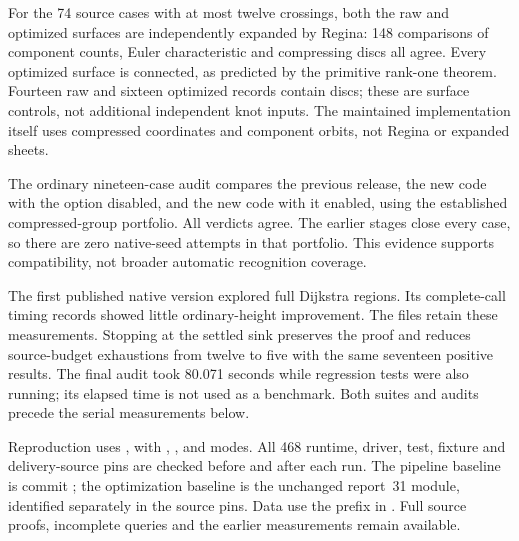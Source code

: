 For the 74 source cases with at most twelve crossings, both the raw and
optimized surfaces are independently expanded by Regina: 148 comparisons
of component counts, Euler characteristic and compressing discs all agree.
Every optimized surface is connected, as predicted by the primitive
rank-one theorem. Fourteen raw and sixteen optimized records contain discs;
these are surface controls, not additional independent knot inputs. The
maintained implementation itself uses compressed coordinates and component
orbits, not Regina or expanded sheets.

The ordinary nineteen-case audit compares the previous release, the new
code with the option disabled, and the new code with it enabled, using the
established compressed-group portfolio. All verdicts agree. The earlier
stages close every case, so there are zero native-seed attempts in that
portfolio. This evidence supports compatibility, not broader automatic
recognition coverage.

The first published native version explored full Dijkstra regions. Its
complete-call timing records showed little ordinary-height improvement.
The  files retain these measurements.
Stopping at the
settled sink preserves the proof and reduces source-budget exhaustions from
twelve to five with the same seventeen positive results. The final audit
took 80.071 seconds while regression tests were also running; its elapsed
time is not used as a benchmark. Both suites and audits precede the serial
measurements below.



Reproduction uses , with
, ,  and  modes.
All 468 runtime, driver, test, fixture and delivery-source pins are checked
before and after each run. The pipeline baseline is commit
; the optimization baseline is the unchanged report~31
module, identified separately in the source pins. Data use the
 prefix in . Full source proofs, incomplete
queries and the earlier measurements remain available.
